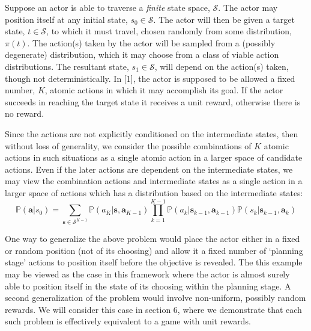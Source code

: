 \documentclass{article}
\newcommand{\PP}{\mathbb{P}}
\newcommand{\Ss}{\mathcal{S}}
\begin{document}

Suppose an actor is able to traverse a \textit{finite} state space, $\Ss$. 
The actor may position itself at any initial state, $s_0\in \Ss$. 
The actor will then be given a target state, $t\in \Ss$, to which it must travel, chosen randomly from some distribution, $\pi(t)$. 
The action(s) taken by the actor will be sampled from a (possibly degenerate) distribution, which it may choose from a class of viable action distributions. 
The resultant state, $s_1\in\Ss$, will depend on the action(s) taken, though not deterministically.  
In [1], the actor is supposed to be allowed a fixed number, $K$, atomic actions in which it may accomplish its goal.
If the actor succeeds in reaching the target state it receives a unit reward, otherwise there is no reward.

Since the actions are not explicitly conditioned on the intermediate states, then without loss of generality, we consider the possible combinations of $K$ atomic actions in such situations as a single atomic action in a larger space of candidate actions.
Even if the later actions are dependent on the intermediate states, we may view the combination actions and intermediate states as a single action in a larger space of actions which has a distribution based on the intermediate states:
\[\PP(\mathbf{a}|s_0) = \sum_{\mathbf{s}\in \Ss^{K-1}} \PP(a_K|\mathbf{s},\mathbf{a}_{K-1}) \prod_{k=1}^{K-1} \PP(a_k|\mathbf{s}_{k-1},\mathbf{a}_{k-1})\PP(s_{k}|\mathbf{s}_{k-1},\mathbf{a}_k)\]

One way to generalize the above problem would place the actor either in a fixed or random position (not of its choosing) and allow it a fixed number of `planning stage' actions to position itself before the objective is revealed. 
The this example may be viewed as the case in this framework where the actor is almost surely able to position itself in the state of its choosing within the planning stage.
A second generalization of the problem would involve non-uniform, possibly random rewards. We will consider this case in section 6, where we demonstrate that each such problem is effectively equivalent to a game with unit rewards. 

\end{document}
